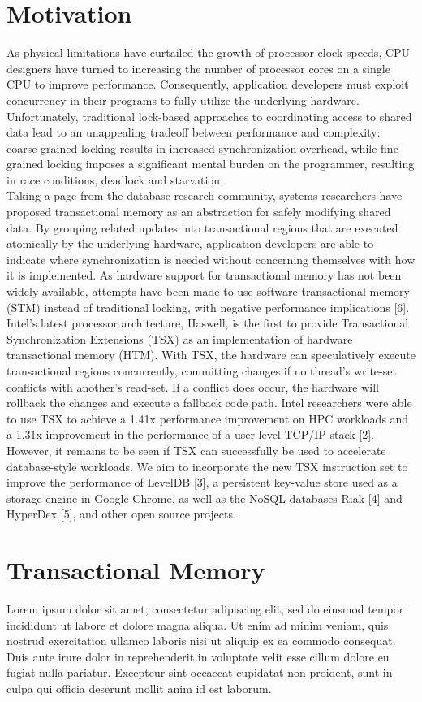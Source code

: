 \documentclass{acm_proc_article-sp}
\begin{document}
\section*{Motivation}
\tab As physical limitations have curtailed the growth of processor clock speeds, CPU designers have turned to increasing the number of processor cores on a single CPU to improve performance. Consequently, application developers must exploit concurrency in their programs to fully utilize the underlying hardware. Unfortunately, traditional lock-based approaches to coordinating access to shared data lead to an unappealing tradeoff between performance and complexity: coarse-grained locking results in increased synchronization overhead, while fine-grained locking imposes a significant mental burden on the programmer, resulting in race conditions, deadlock and starvation.\\
\tab Taking a page from the database research community, systems researchers have proposed transactional memory as an abstraction for safely modifying shared data. By grouping related updates into transactional regions that are executed atomically by the underlying hardware, application developers are able to indicate where synchronization is needed without concerning themselves with how it is implemented. As hardware support for transactional memory has not been widely available, attempts have been made to use software transactional memory (STM) instead of traditional locking, with negative performance implications [6].\\
\tab Intel's latest processor architecture, Haswell, is the first to provide Transactional Synchronization Extensions (TSX) as an implementation of hardware transactional memory (HTM). With TSX, the hardware can speculatively execute transactional regions concurrently, committing changes if no thread's write-set conflicts with another's read-set. If a conflict does occur, the hardware will rollback the changes and execute a fallback code path. Intel researchers were able to use TSX to achieve a 1.41x performance improvement on HPC workloads and a 1.31x improvement in the performance of a user-level TCP/IP stack [2]. However, it remains to be seen if TSX can successfully be used to accelerate database-style workloads. We aim to incorporate the new TSX instruction set to improve the performance of LevelDB [3], a persistent key-value store used as a storage engine in Google Chrome, as well as the NoSQL databases Riak [4] and HyperDex [5], and other open source projects.


\section*{Transactional Memory}
Lorem ipsum dolor sit amet, consectetur adipiscing elit, sed do eiusmod tempor incididunt ut labore et dolore magna aliqua. Ut enim ad minim veniam, quis nostrud exercitation ullamco laboris nisi ut aliquip ex ea commodo consequat. Duis aute irure dolor in reprehenderit in voluptate velit esse cillum dolore eu fugiat nulla pariatur. Excepteur sint occaecat cupidatat non proident, sunt in culpa qui officia deserunt mollit anim id est laborum.
\end{document}
